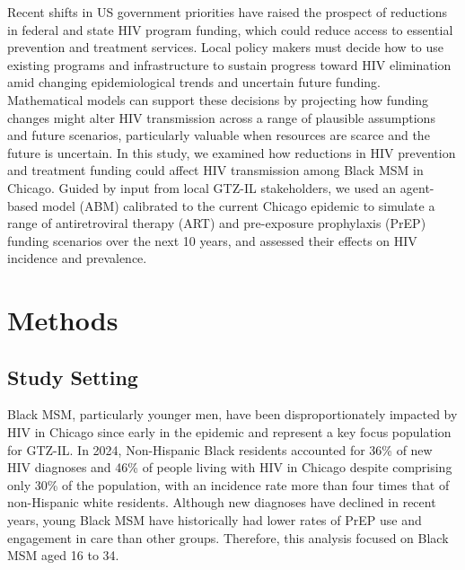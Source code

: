 \documentclass[preprint,12pt]{elsarticle}
\begin{document}
Recent shifts in US government priorities have raised the prospect of reductions in federal and state HIV program funding, which could reduce access to essential prevention and treatment services. Local policy makers must decide how to use existing programs and infrastructure to sustain progress toward HIV elimination amid changing epidemiological trends and uncertain future funding. Mathematical models can support these decisions by projecting how funding changes might alter HIV transmission across a range of plausible assumptions and future scenarios, particularly valuable when resources are scarce and the future is uncertain. In this study, we examined how reductions in HIV prevention and treatment funding could affect HIV transmission among Black MSM in Chicago. Guided by input from local GTZ-IL stakeholders, we used an agent-based model (ABM) calibrated to the current Chicago epidemic to simulate a range of antiretroviral therapy (ART) and pre-exposure prophylaxis (PrEP) funding scenarios over the next 10 years, and assessed their effects on HIV incidence and prevalence.


\section{Methods}
\label{sec:methods}
\subsection{Study Setting}
\label{sec:methods-setting}
Black MSM, particularly younger men, have been disproportionately impacted by HIV in Chicago since early in the epidemic and represent a key focus population for GTZ-IL. 
In 2024, Non-Hispanic Black residents accounted for 36\% of new HIV diagnoses and 46\% of people living with HIV in Chicago despite comprising only 30\% of the population, with an incidence rate more than four times that of non-Hispanic white residents. Although new diagnoses have declined in recent years, young Black MSM have historically had lower rates of PrEP use and engagement in care than other groups. Therefore, this analysis focused on Black MSM aged 16 to 34. 
\end{document}
